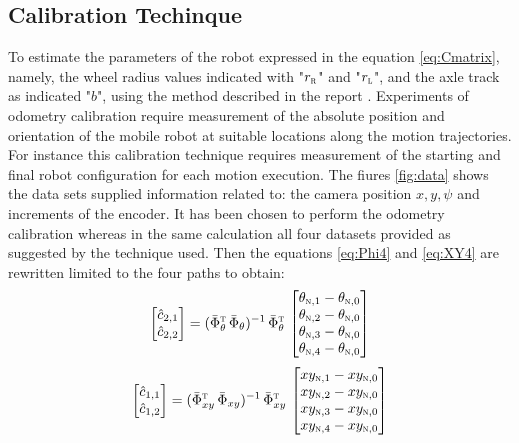 \subsection{Calibration Techinque}
To estimate the parameters of the robot expressed in the equation \ref{eq:Cmatrix}, namely, the wheel radius values indicated with "$r_\textsc{r}$" and "$r_\textsc{l}$", and the axle track as indicated "$b$", using the method described in the report \cite{1512356}.
Experiments of odometry calibration require measurement of the absolute position and orientation of the mobile robot at suitable locations along the motion trajectories. For instance this calibration technique requires measurement of the starting and final robot configuration for each motion execution. The fiures \ref{fig:data} shows the data sets supplied information related to: the camera position $x, y, \psi$ and increments of the encoder.
It has been chosen to perform the odometry calibration whereas in the same calculation all four datasets provided as suggested by the technique used. Then the equations \ref{eq:Phi4} and \ref{eq:XY4} are rewritten limited to the four paths to obtain:
\begin{equation}
\label{eq:Phi4}
	\begin{bmatrix}
		\hat{c}_{2,1}\\
		\hat{c}_{2,2}
	\end{bmatrix} =	(\bar{\Phi}_{\theta}^{\textsc{t}} \, \bar{\Phi}_{\theta})^{-1} \, \bar{\Phi}_{\theta}^{\textsc{t}} \, 
	\begin{bmatrix}
		\theta_{\textsc{n},1} - \theta_{\textsc{n},0}\\
		\theta_{\textsc{n},2} - \theta_{\textsc{n},0}\\
		\theta_{\textsc{n},3} - \theta_{\textsc{n},0}\\
		\theta_{\textsc{n},4} - \theta_{\textsc{n},0}
	\end{bmatrix}
\end{equation}
\begin{equation}
\label{eq:XY4}
	\begin{bmatrix}
		\hat{c}_{1,1}\\
		\hat{c}_{1,2}
	\end{bmatrix} = (\bar{\Phi}_{xy}^{\textsc{t}} \, \bar{\Phi}_{xy})^{-1} \, \bar{\Phi}_{xy}^{\textsc{t}} \, 
	\begin{bmatrix}
		xy_{\textsc{n},1} - xy_{\textsc{n},0}\\
		xy_{\textsc{n},2} - xy_{\textsc{n},0}\\
		xy_{\textsc{n},3} - xy_{\textsc{n},0}\\
		xy_{\textsc{n},4} - xy_{\textsc{n},0}
	\end{bmatrix}
\end{equation}
